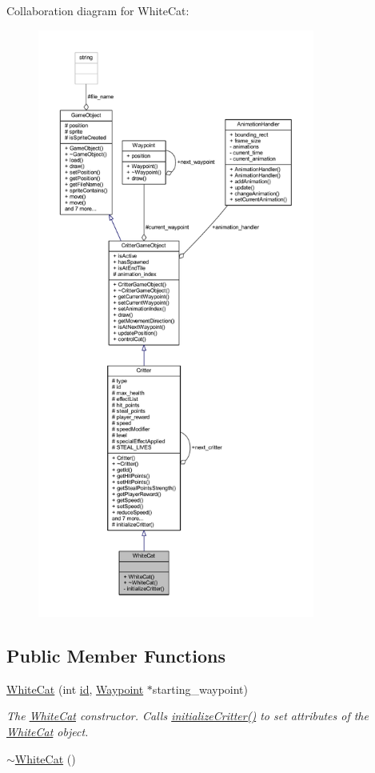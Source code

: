 Collaboration diagram for White\+Cat\+:
\nopagebreak
\begin{figure}[H]
\begin{center}
\leavevmode
\includegraphics[height=550pt]{class_white_cat__coll__graph}
\end{center}
\end{figure}
\subsection*{Public Member Functions}
\begin{DoxyCompactItemize}
\item 
\hyperlink{class_white_cat_a1af91c1252fac9ac94a9334bff97f6df}{White\+Cat} (int \hyperlink{class_critter_ae775e0ebe6e8bbe249c403670bda46f8}{id}, \hyperlink{class_waypoint}{Waypoint} $\ast$starting\+\_\+waypoint)
\begin{DoxyCompactList}\small\item\em The \hyperlink{class_white_cat}{White\+Cat} constructor. Calls \hyperlink{class_white_cat_a0a3c801e7a6b451b2b1caef9da137585}{initialize\+Critter()} to set attributes of the \hyperlink{class_white_cat}{White\+Cat} object. \end{DoxyCompactList}\item 
\hyperlink{class_white_cat_aa69986549bb464efd356e3143edfd830}{$\sim$\+White\+Cat} ()
\end{DoxyCompactItemize}
